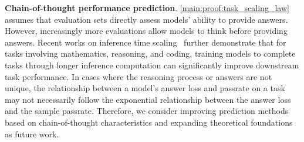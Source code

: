 \noindent\textbf{Chain-of-thought performance prediction}.
\cref{main:proof:task_scaling_law} assumes that evaluation sets directly assess models' ability to provide answers. However, increasingly more evaluations allow models to think before providing answers. Recent works on inference time scaling~\citep{snell2024scaling, bansal2024smaller} further demonstrate that for tasks involving mathematics, reasoning, and coding, training models to complete tasks through longer inference computation can significantly improve downstream task performance. In cases where the reasoning process or answers are not unique, the relationship between a model's answer loss and passrate on a task may not necessarily follow the exponential relationship between the answer loss and the sample passrate.  Therefore, we consider improving prediction methods based on chain-of-thought characteristics and expanding theoretical foundations as future work.


